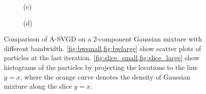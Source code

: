 \begin{figure}[t!]
\begin{subfigure}[b]{0.48\textwidth}
    \caption{(c)\label{fig:slice_small}}
\end{subfigure}
\hfill
\centering
\begin{subfigure}[b]{0.48\textwidth}
    \caption{(d)\label{fig:slice_large}}
\end{subfigure}


\caption{Comparison of A-SVGD on a 2-component Gaussian mixture with different bandwidth. \cref{fig:bwsmall,fig:bwlarge} show scatter plots of particles at the last iteration. \cref{fig:slice_small,fig:slice_large} show histograms of the particles by projecting the locations to the line $y = x$, where the orange curve denotes the density of Gaussian mixture along the slice $y = x$.}
\label{fig:differentBW}
\end{figure}


\begin{figure}[t!]
    
\end{figure}


